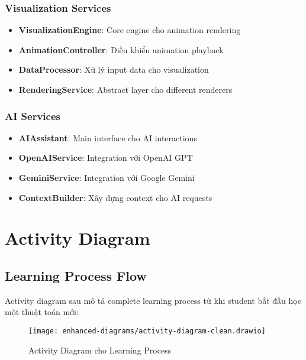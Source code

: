 \subsubsection{Visualization Services}

\begin{itemize}
    \item \textbf{VisualizationEngine}: Core engine cho animation rendering
    \item \textbf{AnimationController}: Điều khiển animation playback
    \item \textbf{DataProcessor}: Xử lý input data cho visualization
    \item \textbf{RenderingService}: Abstract layer cho different renderers
\end{itemize}

\subsubsection{AI Services}

\begin{itemize}
    \item \textbf{AIAssistant}: Main interface cho AI interactions
    \item \textbf{OpenAIService}: Integration với OpenAI GPT
    \item \textbf{GeminiService}: Integration với Google Gemini
    \item \textbf{ContextBuilder}: Xây dựng context cho AI requests
\end{itemize}

\section{Activity Diagram}
\label{sec:activity-diagram}

\subsection{Learning Process Flow}
\label{subsec:learning-flow}

Activity diagram sau mô tả complete learning process từ khi student bắt đầu học một thuật toán mới:

\begin{figure}[H]
\centering
\texttt{[image: enhanced-diagrams/activity-diagram-clean.drawio]}
\caption{Activity Diagram cho Learning Process}
\label{fig:activity-learning}
\end{figure}


